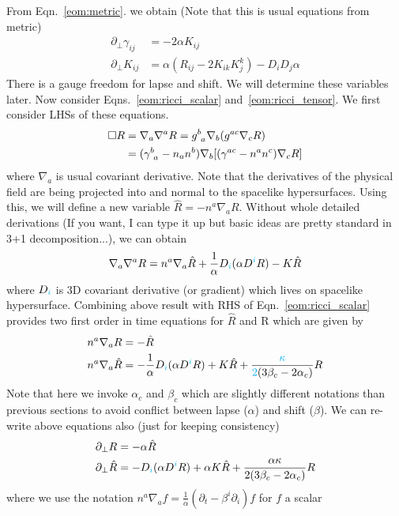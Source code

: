 \documentclass[a4paper,oneside,openany,11pt]{memoir}
\numberwithin{equation}{section} %
\newcommand{\aaron}[1]{{\color{cyan} #1}}
\begin{document}
From Eqn.~\ref{eom:metric}. we obtain (Note that this is usual equations from metric)
\begin{align}
\partial_\bot \gamma_{ij} &= - 2 \alpha K_{ij} \\
\partial_\bot K_{ij} &= \alpha (R_{ij} - 2 K_{ik}K^{k}_j) - D_i D_j \alpha
\end{align}
There is a gauge freedom for lapse and shift. We will determine these variables later.
Now consider Eqns.~\ref{eom:ricci_scalar} and~\ref{eom:ricci_tensor}.
We first consider LHSs of these equations. 
\begin{align}
\Box R &= \nabla_a \nabla^a R 
=g\indices{^b_a} \nabla_b(g^{ac} \nabla_c R) \nonumber \\
&= (\gamma\indices{^b_a} - n_a n^b)\nabla_b [(\gamma^{ac} - n^a n^c) \nabla_c R]
\end{align} 
where $\nabla_a$ is usual covariant derivative.
Note that the derivatives of the physical field are being projected into and normal to the spacelike
hypersurfaces. Using this, we will define a new variable $\hat{R} = - n^a \nabla_a R$.
Without whole detailed derivations (If you want, I can type it up but basic ideas are pretty standard in 
3+1 decomposition...), we can obtain
\begin{align}
\nabla_a \nabla^a R = n^a \nabla_a \hat{R} + \frac{1}{\alpha} D_\aaron{i} (\alpha D^\aaron{i} R) - K \hat{R}
\end{align}
where $D_\aaron{i}$ is 3D covariant derivative (or gradient) which lives on spacelike hypersurface.
Combining above result with RHS of Eqn.~\ref{eom:ricci_scalar} provides two first order in time equations
for $\hat{R}$ and R which are given by
\begin{align}
n^a \nabla_a R &= - \hat{R}  \\
n^a \nabla_a \hat{R} &= -  \frac{1}{\alpha} D_\aaron{i} (\alpha D^\aaron{i} R) + K \hat{R} + \frac{\aaron{\kappa}}{\aaron{2} (3\beta_c - 2 \alpha_c)} R
\end{align}
Note that here we invoke $\alpha_c$ and $\beta_c$ which are slightly different notations than previous sections
to avoid conflict between lapse ($\alpha$) and shift ($\beta$).
We can re-write above equations also (just for keeping consistency)
\begin{align}
\partial_\bot R &= - \alpha \hat{R}  \\
\partial_\bot \hat{R} &= - D_\aaron{i} (\alpha D^\aaron{i} R) + \alpha K \hat{R} + \frac{\alpha \kappa}{2 (3\beta_c - 2 \alpha_c)} R
\end{align}
where we use the notation $n^a \nabla_a f = \frac{1}{\alpha} (\partial_t - \beta^i \partial_i)f$ for $f$ a scalar
\end{document}
